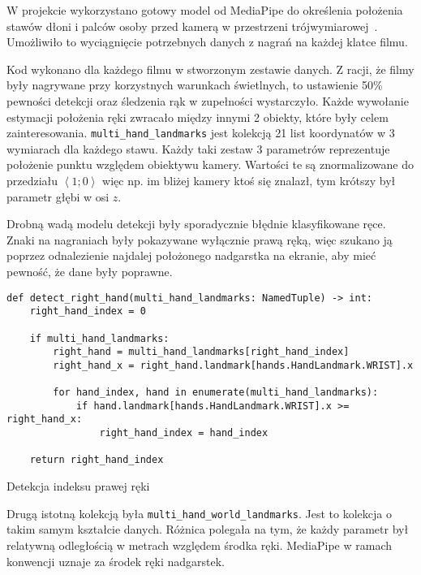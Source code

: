 W projekcie wykorzystano gotowy model od MediaPipe do określenia położenia stawów dłoni i palców osoby przed kamerą w przestrzeni trójwymiarowej~\cite{vakunov2020}. Umożliwiło to wyciągnięcie potrzebnych danych z nagrań na każdej klatce filmu.

Kod wykonano dla każdego filmu w stworzonym zestawie danych. Z racji, że filmy były nagrywane przy korzystnych warunkach świetlnych, to ustawienie 50\% pewności detekcji oraz śledzenia rąk w zupełności wystarczyło. Każde wywołanie estymacji położenia ręki zwracało między innymi 2 obiekty, które były celem zainteresowania. \texttt{multi_hand_landmarks} jest kolekcją 21 list koordynatów w 3 wymiarach dla każdego stawu. Każdy taki zestaw 3 parametrów reprezentuje położenie punktu względem obiektywu kamery. Wartości te są znormalizowane do przedziału $\left\langle1;0\right\rangle$ więc np. im bliżej kamery ktoś się znalazł, tym krótszy był parametr głębi w osi $z$.

Drobną wadą modelu detekcji były sporadycznie błędnie klasyfikowane ręce. Znaki na nagraniach były pokazywane wyłącznie prawą ręką, więc szukano ją poprzez odnalezienie najdalej położonego nadgarstka na ekranie, aby mieć pewność, że dane były poprawne.

\begin{listing}[H]
    \color{white}
    \begin{verbatim}
def detect_right_hand(multi_hand_landmarks: NamedTuple) -> int:
    right_hand_index = 0

    if multi_hand_landmarks:
        right_hand = multi_hand_landmarks[right_hand_index]
        right_hand_x = right_hand.landmark[hands.HandLandmark.WRIST].x

        for hand_index, hand in enumerate(multi_hand_landmarks):
            if hand.landmark[hands.HandLandmark.WRIST].x >= right_hand_x:
                right_hand_index = hand_index

    return right_hand_index
    \end{verbatim}
    \caption{Detekcja indeksu prawej ręki}
    \label{lst:right-hand-detection}
\end{listing}

Drugą istotną kolekcją była \texttt{multi_hand_world_landmarks}. Jest to kolekcja o takim samym kształcie danych. Różnica polegała na tym, że każdy parametr był relatywną odległością w metrach względem środka ręki. MediaPipe w ramach konwencji uznaje za środek ręki nadgarstek.

